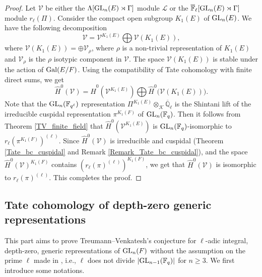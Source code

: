 \documentclass[10pt, reqno]{amsart}
\theoremstyle{plain}
\numberwithin{equation}{section} \newcommand{\di}{\operatorname{dim}}
\begin{document}
\begin{proof}
  Let $\mathcal{V}$ be either the
  $\Lambda[{\rm GL}_n(E)\rtimes \Gamma]$ module $\mathcal{L}$
  or the $\overline{\mathbb{F}}_\ell[{\rm GL}_n(E) \rtimes\Gamma]$
  module $r_\ell(\Pi)$. Consider the compact open subgroup $K_1(E)$ of
  ${\rm GL}_n(E)$. We have the following decomposition
$$ \mathcal{V} = \mathcal{V}^{K_1(E)} \bigoplus \mathcal{V}(K_1(E)),$$
where $\mathcal{V}(K_1(E))=\oplus \mathcal{V}_\rho$, where $\rho$ is a
non-trivial representation of $K_1(E)$ and $\mathcal{V}_\rho$ is the
$\rho$ isotypic component in $\mathcal{V}$. The space
$\mathcal{V}(K_1(E))$ is stable under the action of ${\rm Gal}(E/F)$.
Using the compatibility of Tate cohomology with finite direct sums, we
get
\begin{equation}\label{direct_sum}
  \widehat{H}^0(\mathcal{V}) =
  \widehat{H}^0(\mathcal{V}^{K_1(E)}) \bigoplus
  \widehat{H}^0\big(\mathcal{V}(K_1(E))\big).
\end{equation}
Note that the ${\rm GL}_n(\mathbb{F}_{q^\ell})$ representation
$\Pi^{K_1(E)}\otimes_{\mathcal{K}} \overline{\mathbb{Q}}_\ell$ is the
Shintani lift of the irreducible cuspidal representation
$\pi^{K_1(F)}$ of ${\rm GL}_n(\mathbb{F}_q)$. Then it follows from Theorem
\ref{TV_finite_field} that $\widehat{H}^0(\mathcal{V}^{K_1(E)})$ is
${\rm GL}_n(\mathbb{F}_q)$-isomorphic to
$r_\ell(\pi^{K_1(F)})^{(\ell)}$. Since $\widehat{H}^0(\mathcal{V})$ is
irreducible and cuspidal (Theorem \ref{Tate_bc_cuspidal} and Remark
\ref{Remark_Tate_bc_cuspidal}), and the space
$\widehat{H}^0(\mathcal{V})^{K_1(F)}$ contains
$(r_\ell(\pi)^{(\ell)})^{K_1(F)}$, we get that
$\widehat{H}^0(\mathcal{V})$ is isomorphic to $r_\ell(\pi)^{(\ell)}$.
This completes the proof.
\end{proof}
\subsection{Tate cohomology of 
depth-zero generic representations} 
This part aims to prove Treumann--Venkatesh's conjecture for
$\ell$-adic integral, depth-zero, generic representations of
${\rm GL}_n(F)$ without the assumption on the prime $\ell$ made in
\cite{nadimpalli2024tate}, i.e., $\ell$ does not divide
$\lvert{\rm GL}_{n-1}(\mathbb{F}_q) \rvert$ for $n\geq 3$. We first
introduce some notations.
\end{document}
